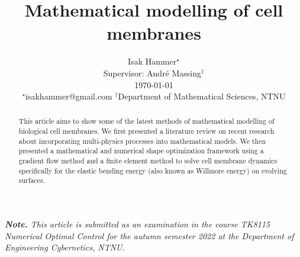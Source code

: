 \documentclass[10pt,conference]{IEEEtran}
\title{ {\Large \textbf{Mathematical modelling of cell membranes }} }
\begin{document}
\author{
Isak Hammer$^{\star}$  \\
{\small Supervisor: André Massing$^{\dagger} $  } \\
{\small  \today}\\
{\footnotesize $^\star$isakhammer@gmail.com }
{\footnotesize $^\dagger$Department of Mathematical Sciences, NTNU}\\
}

\maketitle
\begin{sloppy}
\textit{ \textbf{Note.} This article is submitted as an examination in the course TK8115 Numerical Optimal Control for the autumn semester 2022 at the Department of Engineering Cybernetics, NTNU. \\}


\begin{abstract}
This article aims to show some of the latest methods of mathematical modelling of biological cell membranes. We first presented a literature review on recent research about incorporating multi-physics processes into mathematical models. We then presented a
mathematical and numerical shape optimization framework using a gradient flow method and
a finite element method to solve cell membrane dynamics specifically for the elastic bending energy (also known as Willmore energy) on evolving surfaces.
\end{abstract}

    
    
    
    
    

    \printbibliography
\end{sloppy}
\end{document}
